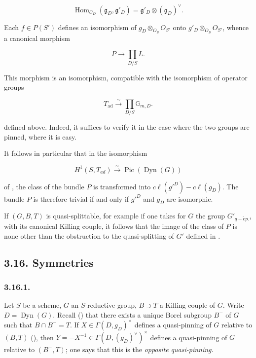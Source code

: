 \[
  \operatorname{Hom}_{\mathcal O_D}(\mathfrak g_D,\mathfrak g'_D)
  =\mathfrak g'_D\otimes(\mathfrak g_D)^\vee .
\]

Each \(f \in P(S')\) defines an isomorphism of \(g_{D} \otimes_{O_{S}} O_{S'}\) onto \(g'_{D} \otimes_{O_{S}} O_{S'}\), whence
a canonical morphism

\[ P \to \prod_{D/S} L. \]

This morphism is an isomorphism, compatible with the isomorphism of operator groups

\[
  T_{\mathrm{ad}}\xrightarrow{\sim}
  \prod_{D/S}\mathbb G_{m,D}.
\]

defined above. Indeed, it suffices to verify it in the case where the two groups are pinned, where it is easy.

It follows in particular that in the isomorphism

\[ H^{1}(S, T_{ad}) \xrightarrow{\sim} \operatorname{Pic}(\operatorname{Dyn}(G)) \]

of , the class of the bundle \(P\) is transformed into \(c\ell(g'^{D}) - c\ell(g_{D})\). The bundle \(P\) is therefore
trivial if and only if \(g'^{D}\) and \(g_{D}\) are isomorphic.

If \((G, B, T)\) is quasi-splittable, for example if one takes for \(G\) the group \(G'_{q-\acute{e}p.}\), with its canonical
Killing couple, it follows that the image of the class of \(P\) is none other than the obstruction to the quasi-splitting
of \(G'\) defined in .

\subsection*{3.16. Symmetries}

\subsubsection*{3.16.1.}

Let \(S\) be a scheme, \(G\) an \(S\)-reductive group, \(B \supset T\) a Killing couple of \(G\). Write \(D = \operatorname{Dyn}(G)\). Recall () that there exists a unique Borel subgroup \(B^{-}\) of \(G\) such that \(B \cap B^{-} = T\). If \(X \in \Gamma(D,
g_{D})^{\times}\) defines a quasi-pinning of \(G\) relative to \((B, T)\) (), then \(Y = -X^{-1} \in \Gamma(D,
(g_{D})^{\vee})^{\times}\) defines a quasi-pinning of \(G\) relative to \((B^{-}, T)\); one says that this is the \emph{opposite
quasi-pinning}.

